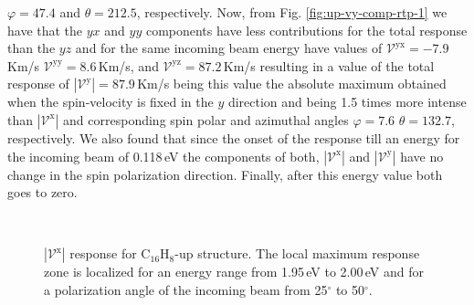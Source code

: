 \documentclass[prb,11pt,tightenlines,twocolumn,aps]{revtex4-1}
\begin{document}
$\varphi=47.4$ and $\theta=212.5$, respectively.
% 
Now, from Fig. \ref{fig:up-vy-comp-rtp-1} we have that the $yx$ and $yy$
components have less contributions for the total response than the $yz$ and for
the same incoming beam energy have values of 
% 
$\mathcal{V}^{\mathrm{yx}}= -7.9$\,Km/s 
$\mathcal{V}^{\mathrm{yy}}=  8.6$\,Km/s, and
$\mathcal{V}^{\mathrm{yz}}= 87.2$\,Km/s 
% 
resulting in a value of the total response of
% 
$|\mathcal{V}^{\mathrm{y}}|=87.9$\,Km/s
% 
being this value the absolute maximum obtained when the spin-velocity is fixed
in the $y$ direction and being 1.5 times more intense than
$|\mathcal{V}^{\mathrm{x}}|$ and corresponding spin polar and azimuthal angles
$\varphi=7.6$ $\theta=132.7$, respectively. We also found that since the onset
of the response till an energy for the incoming beam of 0.118\,eV the components
of both, $|\mathcal{V}^{\mathrm{x}}|$ and $|\mathcal{V}^{\mathrm{y}}|$ have no
change in the spin polarization direction. Finally, after this energy value both
goes to zero.
\begin{figure}[t]
    \centering
    \\
    \caption{$|\mathcal{V}^{\mathrm{x}}|$ response for C$_{16}$H$_{8}$-up
    structure. The local maximum response zone is localized for an energy range
    from 1.95\,eV to 2.00\,eV and for a polarization angle of the incoming beam
    from 25$^{\circ}$ to 50$^{\circ}$.}
    \label{fig:up-3d-2}
\end{figure}
\end{document}
